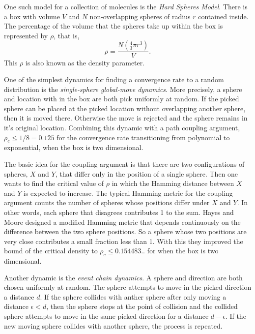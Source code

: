 \documentclass[a4paper,11pt]{article}
\begin{document}
One such model for a collection of molecules is the \textit{Hard Spheres Model}.  There is a box with volume $V$ and $N$ non-overlapping spheres of radius $r$ contained inside.  The percentage of the volume that the spheres take up within the box is represented by $\rho$, that is,
\begin{displaymath}
  \rho = \frac{N(\frac{4}{3}\pi r^3)}{V}.
\end{displaymath}
This $\rho$ is also known as the density parameter. %

One of the simplest dynamics for finding a convergence rate to a random distribution is the \textit{single-sphere global-move dynamics}.  More precisely, a sphere and location with in the box are both pick uniformly at random.  If the picked sphere can be placed at the picked location without overlapping another sphere, then it is moved there.  Otherwise the move is rejected and the sphere remains in it's original location.  Combining this dynamic with a path coupling argument, $\rho_c \le 1/8 = 0.125$ \cite{Kannan} for the convergence rate transitioning from polynomial to exponential, when the box is two dimensional.

The basic idea for the coupling argument is that there are two configurations of spheres, $X$ and $Y$, that differ only in the position of a single sphere.  Then one wants to find the critical value of $\rho$ in which the Hamming distance between $X$ and $Y$ is expected to increase.  The typical Hamming metric for the coupling argument counts the number of spheres whose positions differ under $X$ and $Y$.  In other words, each sphere that disagrees contributes 1 to the sum.  Hayes and Moore \cite{Hayes} designed a modified Hamming metric that depends continuously on the difference between the two sphere positions.  So a sphere whose two positions are very close contributes a small fraction less than 1.  With this they improved the bound of the critical density to $\rho_c \le 0.154483..$ for when the box is two dimensional.

Another dynamic is the \textit{event chain dynamics}.  A sphere and direction are both chosen uniformly at random.  The sphere attempts to move in the picked direction a distance $d$.  If the sphere collides with anther sphere after only moving a distance $\epsilon < d$, then the sphere stops at the point of collision and the collided sphere attempts to move in the same picked direction for a distance $d - \epsilon$.  If the new moving sphere collides with another sphere, the process is repeated.
\end{document}
